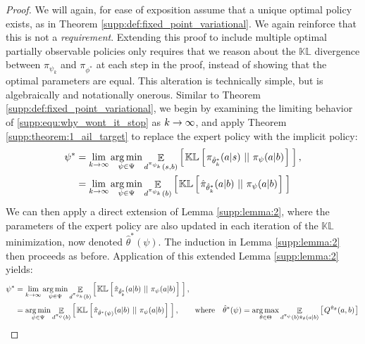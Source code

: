 \begin{proof}
We will again, for ease of exposition assume that a unique optimal policy exists, as in Theorem \ref{supp:def:fixed_point_variational}. We again reinforce that this is not a \emph{requirement}.  Extending this proof to include multiple optimal partially observable policies only requires that we reason about the $\mathbb{KL}$ divergence between $\pi_{\psi_k}$ and $\pi_{\phi^*}$ at each step in the proof, instead of showing that the optimal parameters are equal.  This alteration is technically simple, but is algebraically and notationally onerous.   Similar to Theorem \ref{supp:def:fixed_point_variational}, we begin by examining the limiting behavior of \eqref{supp:equ:why_wont_it_stop} as $k \rightarrow \infty$, and apply Theorem \ref{supp:theorem:1_ail_target} to replace the expert policy with the implicit policy:
\begin{align}
    \psi^* &= \lim_{k \rightarrow \infty} \mathop{\operatorname{arg\,min}}_{\psi \in \Psi}  \mathop{\mathbb{E}}_{d^{\pi_{\psi_k}}(s,b)}  \left[ \hspace*{0.1em}{}  \mathbb{KL} \left[ \hspace*{0.1em}{}  \pi_{\hat{\theta}^*_k}(a|s) \ ||\ {} \pi_\psi(a|b) \hspace*{0.1em} \right]{}  \hspace*{0.1em} \right]{}, \\
    &= \lim_{k \rightarrow \infty} \mathop{\operatorname{arg\,min}}_{\psi \in \Psi}  \mathop{\mathbb{E}}_{d^{\pi_{\psi_k}}(b)}  \left[ \hspace*{0.1em}{}  \mathbb{KL} \left[ \hspace*{0.1em}{}  \hat{\pi}_{\hat{\theta}^*_k}(a|b) \ ||\ {} \pi_\psi(a|b) \hspace*{0.1em} \right]{}  \hspace*{0.1em} \right]{}
\end{align}
We can then apply a direct extension of Lemma \ref{supp:lemma:2}, where the parameters of the expert policy are also updated in each iteration of the $\mathbb{KL}$ minimization, now denoted $\hat{\theta}^*(\psi)$.  The induction in Lemma \ref{supp:lemma:2} then proceeds as before.  Application of this extended Lemma \ref{supp:lemma:2} yields:
\begin{align}
    \psi^* &= \lim_{k \rightarrow \infty} \mathop{\operatorname{arg\,min}}_{\psi \in \Psi}  \mathop{\mathbb{E}}_{d^{\pi_{\psi_k}}(b)}  \left[ \hspace*{0.1em}{}  \mathbb{KL} \left[ \hspace*{0.1em}{}  \hat{\pi}_{\hat{\theta}^*_k}(a|b) \ ||\ {} \pi_\psi(a|b) \hspace*{0.1em} \right]{}  \hspace*{0.1em} \right]{} ,  \\
    &= \mathop{\operatorname{arg\,min}}_{\psi \in \Psi}  \mathop{\mathbb{E}}_{d^{\pi_{\psi}}(b)}  \left[ \hspace*{0.1em}{}  \mathbb{KL} \left[ \hspace*{0.1em}{}  \hat{\pi}_{\hat{\theta}^*(\psi)}(a|b) \ ||\ {} \pi_\psi(a|b) \hspace*{0.1em} \right]{}  \hspace*{0.1em} \right]{} ,\ \ \ \quad \text{where }\ \   \hat{\theta}^*(\psi) = \mathop{\operatorname{arg\,max}}_{\theta \in \Theta} \mathop{\mathbb{E}}_{d^{{\pi_{\psi}}}(b) \hat{\pi}_{\theta}(a | b)} \left[ \hspace*{0.1em}{} Q^{{\hat{\pi}_{\theta}}}(a,b) \hspace*{0.1em} \right]{} \label{supp:equ:mahh}
\end{align}

\end{proof}
